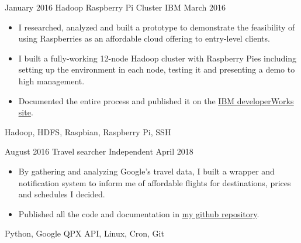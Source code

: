 \begin{projects}
    \emptySeparator

    \project
        {January 2016}
        {Hadoop Raspberry Pi Cluster}
        {IBM}
        {March 2016}
        {
            \begin{itemize}
                \item I researched, analyzed and built a prototype to 
                    demonstrate the feasibility of using Raspberries as an 
                    affordable cloud offering to entry-level clients.
                \item I built a fully-working 12-node Hadoop cluster with 
                    Raspberry Pies including setting up the environment in each 
                    node, testing it and presenting a demo to high management.
                \item Documented the entire process and published it on the 
                    \href{https://developer.ibm.com/recipes/tutorials/building-a-hadoop-cluster-with-raspberry-pi/}
                    {\underline{IBM developerWorks site}}.
            \end{itemize}
        }
        {
            Hadoop,
            HDFS,
            Raspbian,
            Raspberry Pi,
            SSH
        }

    \emptySeparator

    \project
        {August 2016}
        {Travel searcher}
        {Independent}
        {April 2018}
        {
            \begin{itemize}
                \item By gathering and analyzing Google's travel data, I built 
                    a wrapper and notification system to inform me of 
                    affordable flights for destinations, prices and schedules I 
                    decided.
                \item Published all the code and documentation in 
                    \href{https://github.com/alanverdugo/QPX}{\underline{my 
                    github repository}}.
            \end{itemize}
        }
        {
            Python,
            Google QPX API,
            Linux,
            Cron,
            Git
        }

\end{projects}
